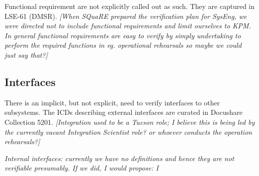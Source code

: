Functional requirement are not explicitly called out as such. They are captured in LSE-61 (DMSR).  \textit{[When SQuaRE prepared the verification plan for SysEng, we were directed not to include functional requirements and limit ourselves to KPM. In general functional requirements are easy to verify by simply undertaking to perform the required functions in eg. operational rehearsals so maybe we could just say that?]}


\subsection{Interfaces}

There is an implicit, but not explicit, need to verify interfaces to other subsystems. The ICDs describing external interfaces are curated in Docushare Collection 5201. \textit{[Integration used to be a Tucson role; I believe this is being led by the currently vacant Integration Scientist role? or whoever conducts the operation rehearsals?]}

\textit{Internal interfaces: currently we have no definitions and hence they are not verifiable presumably. If we did, I would propose: I}
